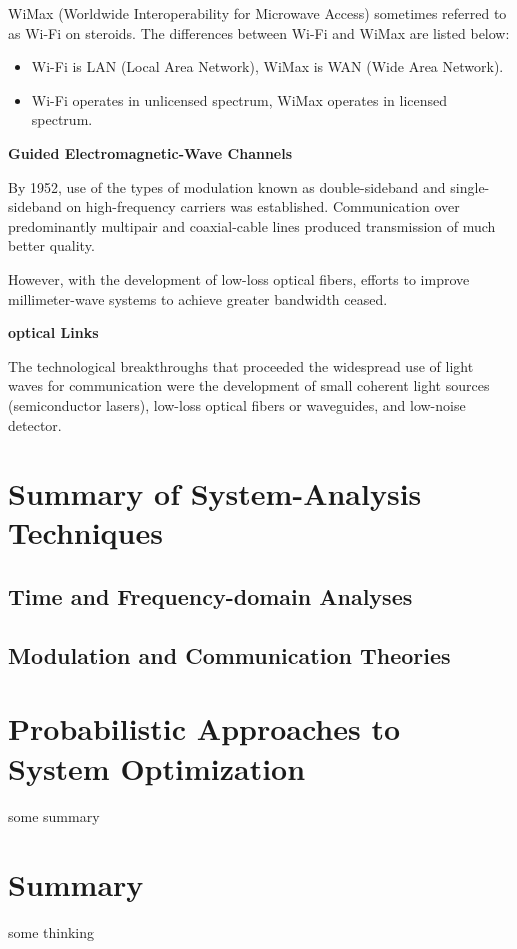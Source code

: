 \documentclass[12pt,a4paper]{book}
\begin{document}
WiMax (Worldwide Interoperability for Microwave Access) sometimes referred to as Wi-Fi on steroids.
The differences between Wi-Fi and WiMax are listed below:
\begin{itemize}
  \item Wi-Fi is LAN (Local Area Network), WiMax is WAN (Wide Area Network).
  \item Wi-Fi operates in unlicensed spectrum, WiMax operates in licensed spectrum.
\end{itemize}

\textbf{Guided Electromagnetic-Wave Channels}

By 1952, use of the types of modulation known as double-sideband and single-sideband on high-frequency carriers was established. Communication over predominantly multipair and coaxial-cable lines produced transmission of much better quality.

However, with the development of low-loss optical fibers, efforts to improve millimeter-wave systems to achieve greater bandwidth ceased.

\textbf{optical Links}

The technological breakthroughs that proceeded the widespread use of light waves for communication were the development of small coherent light sources (semiconductor lasers), low-loss optical fibers or waveguides, and low-noise detector.

\section{Summary of System-Analysis Techniques}
\subsection{Time and Frequency-domain Analyses}

\subsection{Modulation and Communication Theories}

\section{Probabilistic Approaches to System Optimization}
\begin{notebox}[Summary]
some summary
\end{notebox}

\section{Summary}
\begin{notebox}[Thinking]
some thinking
\end{notebox}
\end{document}
